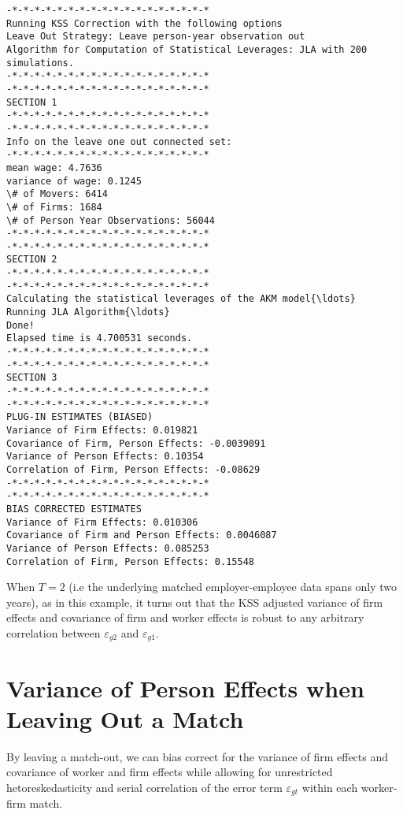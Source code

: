 \documentclass[11pt]{article}
\begin{document}
    \begin{Verbatim}[commandchars=\\\{\}]
-*-*-*-*-*-*-*-*-*-*-*-*-*-*-*-*-*-*
Running KSS Correction with the following options
Leave Out Strategy: Leave person-year observation out
Algorithm for Computation of Statistical Leverages: JLA with 200 simulations.
-*-*-*-*-*-*-*-*-*-*-*-*-*-*-*-*-*-*
-*-*-*-*-*-*-*-*-*-*-*-*-*-*-*-*-*-*
SECTION 1
-*-*-*-*-*-*-*-*-*-*-*-*-*-*-*-*-*-*
-*-*-*-*-*-*-*-*-*-*-*-*-*-*-*-*-*-*
Info on the leave one out connected set:
-*-*-*-*-*-*-*-*-*-*-*-*-*-*-*-*-*-*
mean wage: 4.7636
variance of wage: 0.1245
\# of Movers: 6414
\# of Firms: 1684
\# of Person Year Observations: 56044
-*-*-*-*-*-*-*-*-*-*-*-*-*-*-*-*-*-*
-*-*-*-*-*-*-*-*-*-*-*-*-*-*-*-*-*-*
SECTION 2
-*-*-*-*-*-*-*-*-*-*-*-*-*-*-*-*-*-*
-*-*-*-*-*-*-*-*-*-*-*-*-*-*-*-*-*-*
Calculating the statistical leverages of the AKM model{\ldots}
Running JLA Algorithm{\ldots}
Done!
Elapsed time is 4.700531 seconds.
-*-*-*-*-*-*-*-*-*-*-*-*-*-*-*-*-*-*
-*-*-*-*-*-*-*-*-*-*-*-*-*-*-*-*-*-*
SECTION 3
-*-*-*-*-*-*-*-*-*-*-*-*-*-*-*-*-*-*
-*-*-*-*-*-*-*-*-*-*-*-*-*-*-*-*-*-*
PLUG-IN ESTIMATES (BIASED)
Variance of Firm Effects: 0.019821
Covariance of Firm, Person Effects: -0.0039091
Variance of Person Effects: 0.10354
Correlation of Firm, Person Effects: -0.08629
-*-*-*-*-*-*-*-*-*-*-*-*-*-*-*-*-*-*
-*-*-*-*-*-*-*-*-*-*-*-*-*-*-*-*-*-*
BIAS CORRECTED ESTIMATES
Variance of Firm Effects: 0.010306
Covariance of Firm and Person Effects: 0.0046087
Variance of Person Effects: 0.085253
Correlation of Firm, Person Effects: 0.15548
    \end{Verbatim}

    When \(T=2\) (i.e the underlying matched employer-employee data spans
only two years), as in this example, it turns out that the KSS adjusted
variance of firm effects and covariance of firm and worker effects is
robust to any arbitrary correlation between \(\varepsilon_{g2}\) and
\(\varepsilon_{g1}\).

    \hypertarget{variance-of-person-effects-when-leaving-out-a-match}{%
\section{Variance of Person Effects when Leaving Out a
Match}\label{sec:var_pe}}

By leaving a match-out, we can bias correct for the variance of firm
effects and covariance of worker and firm effects while allowing for
unrestricted hetoreskedasticity and serial correlation of the error term
\(\varepsilon_{gt}\) within each worker-firm match.
\end{document}
